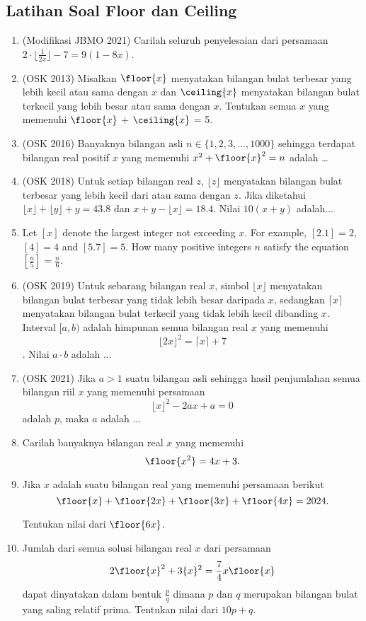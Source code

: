 \subsection{Latihan Soal Floor dan Ceiling}
\begin{enumerate}
    \item (Modifikasi JBMO 2021) Carilah seluruh penyelesaian dari persamaan $2\cdot \lfloor{\frac{1}{2x}}\rfloor - 7 = 9(1 - 8x)$.

    \item (OSK 2013) Misalkan $\floor{x}$ menyatakan bilangan bulat terbesar yang lebih kecil atau sama dengan $x$ dan $\ceiling{x}$ menyatakan bilangan bulat terkecil yang lebih besar atau sama dengan $x$. Tentukan semua $x$ yang memenuhi $\floor{x}$ + $\ceiling{x}$ = 5.
    
    \item (OSK 2016) Banyaknya bilangan asli $n \in \{1,2,3,\dots,1000\}$ sehingga terdapat bilangan real positif $x$ yang memenuhi $x^2+\floor{x}^2=n$ adalah \dots
    
    \item (OSK 2018) Untuk setiap bilangan real $z$, $\lfloor z \rfloor$ menyatakan bilangan bulat terbesar yang lebih kecil dari atau sama dengan $z$. Jika diketahui $\lfloor x \rfloor + \lfloor y \rfloor + y = 43.8$ dan $x + y - \lfloor x \rfloor = 18.4$. Nilai $10(x + y)$ adalah...
    
    \item Let $[x]$ denote the largest integer not exceeding $x$. For example, $[2.1]=2$, $[4]=4$ and $[5.7]=5$. How many positive integers $n$ satisfy the equation $\left[\frac{n}{5}\right]=\frac{n}{6}$.

    \item (OSK 2019) Untuk sebarang bilangan real $x$, simbol $\lfloor x \rfloor$ menyatakan bilangan bulat terbesar yang tidak lebih besar daripada $x$, sedangkan $\lceil x \rceil$ menyatakan bilangan bulat terkecil yang tidak lebih kecil dibanding $x$. Interval $[a, b)$ adalah himpunan semua bilangan real $x$ yang memenuhi
    $$\lfloor 2x \rfloor^2 = \lceil x \rceil + 7$$.
    Nilai $a \cdot b$ adalah ...

    \item (OSK 2021) Jika $a > 1$ suatu bilangan asli sehingga hasil penjumlahan semua bilangan riil $x$ yang memenuhi persamaan
    $$\lfloor x \rfloor^2 - 2ax + a = 0$$
    adalah $p$, maka $a$ adalah ...

    \item Carilah banyaknya bilangan real $x$ yang memenuhi
    $$\floor{x^2}=4x+3.$$

    \item Jika $x$ adalah suatu bilangan real yang memenuhi persamaan berikut
    $$\floor{x}+\floor{2x}+\floor{3x}+\floor{4x}=2024.$$

    Tentukan nilai dari $\floor{6x}$.

    \item Jumlah dari semua solusi bilangan real $x$ dari persamaan
    $$2\floor{x}^2+3\{x\}^2=\frac{7}{4}x\floor{x}$$
    dapat dinyatakan dalam bentuk $\frac{p}{q}$ dimana $p$ dan $q$ merupakan bilangan bulat yang saling relatif prima. Tentukan nilai dari $10p+q$.
\end{enumerate}